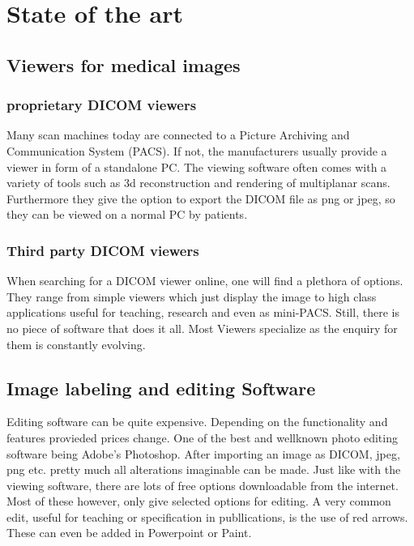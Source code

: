 
\chapter{State of the art}
  \label{SOTA}
\section{Viewers for medical images}
\subsection{proprietary DICOM viewers}
Many scan machines today are connected to a Picture Archiving and Communication System (PACS). If not, the manufacturers usually provide a viewer in form of a standalone PC. The viewing software often comes with a variety of tools such as 3d reconstruction and rendering of multiplanar scans. Furthermore they give the option to export the DICOM file as png or jpeg, so they can be viewed on a normal PC by patients. \cite{ElsevierEnhancedReader}

\subsection{Third party DICOM viewers}
\label{Third party DICOM viewers}
When searching for a DICOM viewer online, one will find a plethora of options. They range from simple viewers which just display the image to high class applications useful for teaching, research and even as mini-PACS. Still, there is no piece of software that does it all. Most Viewers specialize as the enquiry for them is constantly evolving.
\cite{varmaFreeDICOMBrowsers2008}

\section{Image labeling  and editing Software}
\label{Image labeling and editing Software}
Editing software can be quite expensive. Depending on the functionality and features provieded prices change. One of the best and wellknown photo editing software being Adobe's Photoshop. After importing an image as DICOM, jpeg, png etc. pretty much all alterations imaginable can be made. Just like with the viewing software, there are lots of free options downloadable from the internet. Most of these however, only give selected options for editing.
A very common edit, useful for teaching or specification in publlications, is the use of red arrows. These can even be added in Powerpoint or Paint.

